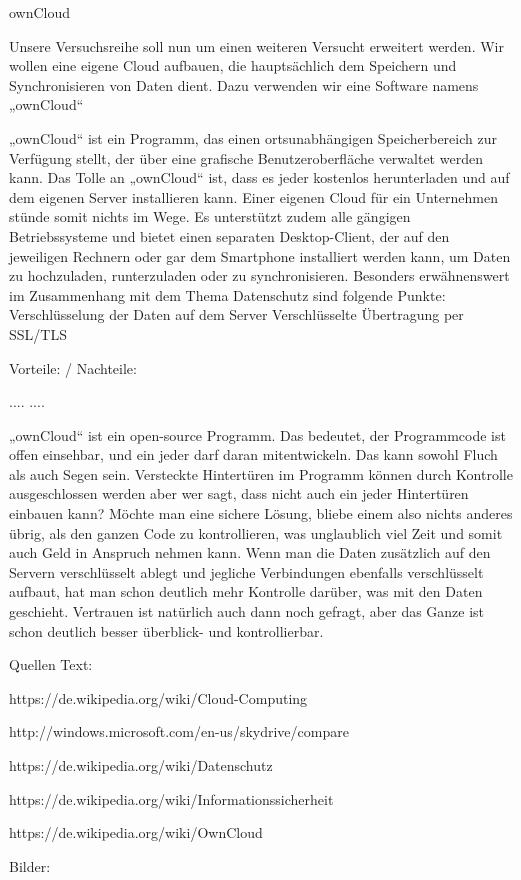   ownCloud

  Unsere Versuchsreihe soll nun um einen weiteren Versucht erweitert werden. Wir wollen eine eigene Cloud aufbauen, die hauptsächlich dem Speichern und Synchronisieren von Daten dient. Dazu verwenden wir eine Software namens „ownCloud“

  „ownCloud“ ist ein Programm, das einen ortsunabhängigen Speicherbereich zur Verfügung stellt, der über eine grafische Benutzeroberfläche verwaltet werden kann. Das Tolle an „ownCloud“ ist, dass es jeder kostenlos herunterladen und auf dem eigenen Server installieren kann. Einer eigenen Cloud für ein Unternehmen stünde somit nichts im Wege. Es unterstützt zudem alle gängigen Betriebssysteme und bietet einen separaten Desktop-Client, der auf den jeweiligen Rechnern oder gar dem Smartphone installiert werden kann, um Daten zu hochzuladen, runterzuladen oder zu synchronisieren.
  Besonders erwähnenswert im Zusammenhang mit dem Thema Datenschutz sind folgende Punkte:
  Verschlüsselung der Daten auf dem Server
  Verschlüsselte Übertragung per SSL/TLS

  Vorteile: / Nachteile:

  ....
  ....

  „ownCloud“ ist ein open-source Programm. Das bedeutet, der Programmcode ist offen einsehbar, und ein jeder darf daran mitentwickeln. Das kann sowohl Fluch als auch Segen sein. Versteckte Hintertüren im Programm können durch Kontrolle ausgeschlossen werden aber wer sagt, dass nicht auch ein jeder Hintertüren einbauen kann? Möchte man eine sichere Lösung, bliebe einem also nichts anderes übrig, als den ganzen Code zu kontrollieren, was unglaublich viel Zeit und somit auch Geld in Anspruch nehmen kann. Wenn man die Daten zusätzlich auf den Servern verschlüsselt ablegt und jegliche Verbindungen ebenfalls verschlüsselt aufbaut, hat man schon deutlich mehr Kontrolle darüber, was mit den Daten geschieht. Vertrauen ist natürlich auch dann noch gefragt, aber das Ganze ist schon deutlich besser überblick- und kontrollierbar.


  Quellen Text:

  https://de.wikipedia.org/wiki/Cloud-Computing


http://windows.microsoft.com/en-us/skydrive/compare

https://de.wikipedia.org/wiki/Datenschutz

https://de.wikipedia.org/wiki/Informationssicherheit

https://de.wikipedia.org/wiki/OwnCloud

Bilder:

